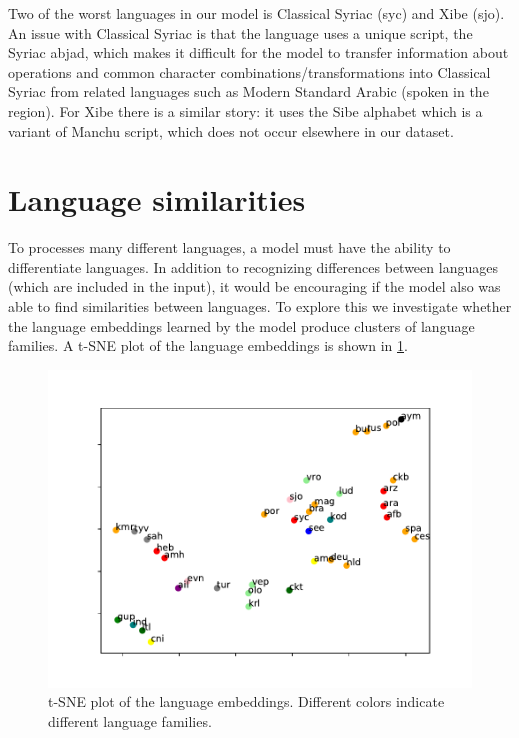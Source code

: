 \documentclass[11pt,a4paper]{article}
\begin{document}
Two of the worst languages in our model is Classical Syriac (syc) and
Xibe (sjo).  An issue with Classical Syriac is that the language uses
a unique script, the Syriac abjad, which makes it difficult for the
model to transfer information about operations and common character
combinations/transformations into Classical Syriac from related
languages such as Modern Standard Arabic (spoken in the region). For
Xibe there is a similar story: it uses the Sibe alphabet which is a
variant of Manchu script, which does not occur elsewhere in our
dataset.



\section{Language similarities}

To processes many different languages, a model must have the
ability to differentiate languages.
In addition to recognizing differences between languages (which are
included in the input), it would be encouraging if the model also was
able to find similarities between languages.  To explore this we
investigate whether the language embeddings learned by the model
produce clusters of language families. A t-SNE plot of the language
embeddings is shown in \cref{fig:lang_tsne}.

\begin{figure}[ht]
\centering
\includegraphics[scale=0.5]{lang_tsne.pdf}
\caption{\label{fig:lang_tsne} t-SNE plot of the language
embeddings. Different colors indicate different language families.}
\end{figure}
\end{document}
